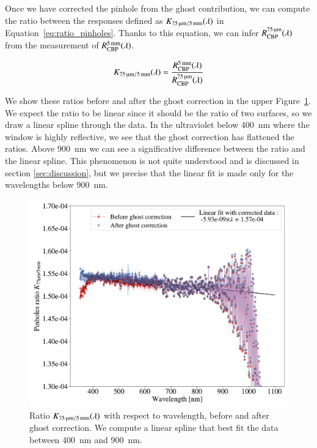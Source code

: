 Once we have corrected the \bpinhole pinhole from the ghost contribution, we can compute the ratio between the \SD responses defined as $K_\mathrm{\SI{75}{\micro\meter}/\SI{5}{\milli\meter}}(\lambda)$ in Equation~\ref{eq:ratio_pinholes}. Thanks to this equation, we can infer $R_{\mathrm{CBP}}^{\SI{75}{\micro\meter}}(\lambda)$ from the measurement of $R_{\mathrm{CBP}}^{\SI{5}{\milli\meter}}(\lambda)$.

\begin{equation}
    K_\mathrm{\SI{75}{\micro\meter}/\SI{5}{\milli\meter}}(\lambda) = \frac{R_{\mathrm{CBP}}^{\SI{5}{\milli\meter}}(\lambda)}{R_{\mathrm{CBP}}^{\SI{75}{\micro\meter}}(\lambda)}
    \label{eq:ratio_pinholes}
\end{equation}

We show these ratios before and after the ghost correction in the upper Figure~\ref{fig:ratio_pinholes}. We expect the ratio to be linear since it should be the ratio of two surfaces, so we draw a linear spline through the data. In the ultraviolet below \SI{400}{\nm} where the window is highly reflective, we see that the ghost correction has flattened the ratios. Above \SI{900}{\nm} we can see a significative difference between the ratio and the linear spline. This phenomenon is not quite understood and is discussed in section \ref{sec:discussion}, but we precise that the linear fit is made only for the wavelengths below \SI{900}{\nano\meter}. 

\begin{figure}[h]
    \centering
    \includegraphics[width=\columnwidth]{fig/ratio_pinholes.pdf}
    \caption{Ratio $K_\mathrm{\SI{75}{\micro\meter}/\SI{5}{\milli\meter}}(\lambda)$ with respect to wavelength, before and after ghost correction. We compute a linear spline that best fit the data between \SI{400}{\nm} and \SI{900}{\nm}.}
    \label{fig:ratio_pinholes}
\end{figure}

